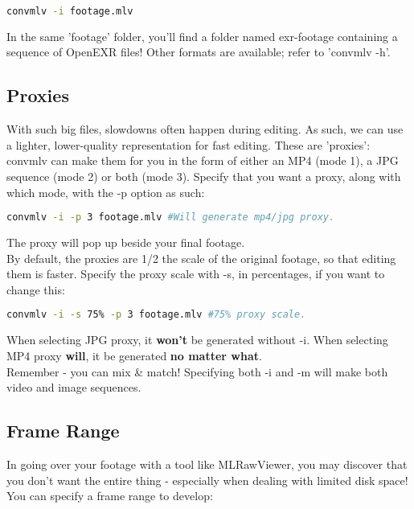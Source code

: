 \documentclass[a4paper,12pt]{article}
\begin{document}
\begin{lstlisting}[language=bash]
	convmlv -i footage.mlv
\end{lstlisting}
		
		In the same 'footage' folder, you'll find a folder named exr-footage containing a sequence of OpenEXR files! Other formats
		are available; refer to 'convmlv -h'.
		
	\subsection{Proxies}

		With such big files, slowdowns often happen during editing. As such, we can use a lighter, lower-quality representation for fast editing.
		These are 'proxies': convmlv can make them for you in the form of either an MP4 (mode 1), a JPG sequence (mode 2) or both (mode 3). Specify
		that you want a proxy, along with which mode, with the -p option as such:
	
\begin{lstlisting}[language=bash]
	convmlv -i -p 3 footage.mlv #Will generate mp4/jpg proxy.
\end{lstlisting}

		The proxy will pop up beside your final footage.\\
		
		By default, the proxies are 1/2 the scale of the original footage, so that editing them is faster.
		Specify the proxy scale with -s, in percentages, if you want to change this:
	
\begin{lstlisting}[language=bash]
	convmlv -i -s 75% -p 3 footage.mlv #75% proxy scale.
\end{lstlisting}

		When selecting JPG proxy, it \textbf{won't} be generated without -i. When selecting MP4 proxy \textbf{will}, it
		be generated \textbf{no matter what}.\\
		
		Remember - you can mix \& match! Specifying both -i and -m will make both video and image sequences.

	\subsection{Frame Range}
		
		In going over your footage with a tool like MLRawViewer, you may discover that you don't want the entire thing - especially
		when dealing with limited disk space! You can specify a frame range to develop:
		
\end{document}
